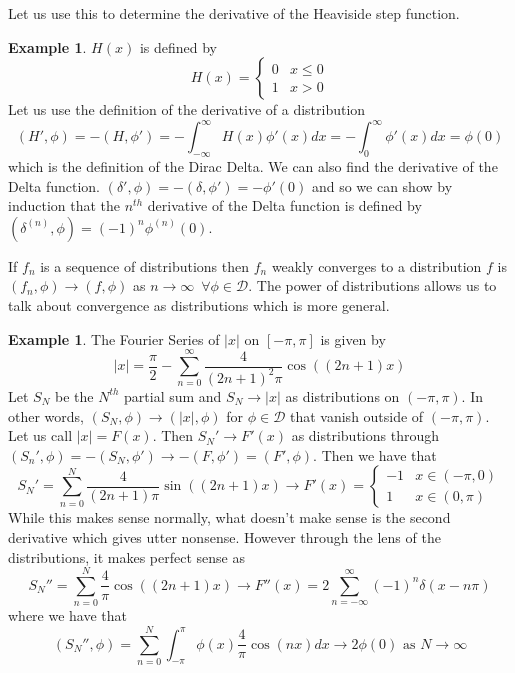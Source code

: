 \documentclass{article}
\theoremstyle{definition}
\newtheorem{example}[theorem]{Example}
\begin{document}
Let us use this to determine the derivative of the Heaviside step function.
\begin{example}
    $H(x)$ is defined by 
    \begin{equation*}
        H(x) = \begin{cases}
            0 & x \leq 0 \\ 1 & x>0
        \end{cases}
    \end{equation*}
    Let us use the definition of the derivative of a distribution 
    \begin{equation*}
        (H',\phi) = -(H,\phi') = -\int^\infty_{-\infty} H(x)\phi'(x)dx = -\int^\infty_0 \phi'(x)dx = \phi(0)
    \end{equation*}
    which is the definition of the Dirac Delta. We can also find the derivative of the Delta function. $(\delta ',\phi) = -(\delta, \phi') =-\phi'(0)$ and so we can show by induction that the $n^{th}$ derivative of the Delta function is defined by $(\delta^{(n)},\phi) = (-1)^n\phi^{(n)}(0)$.
\end{example}
If $f_n$ is a sequence of distributions then $f_n$ weakly converges to a distribution $f$ is $(f_n,\phi)\to (f,\phi)$ as $n\to \infty\,\,\,\forall \phi \in \mathcal{D}$.
The power of distributions allows us to talk about convergence as distributions which is more general. 
\begin{example}
    The Fourier Series of $|x|$ on $[-\pi,\pi]$ is given by 
    \begin{equation*}
        |x| = \frac{\pi}{2} -\sum^\infty_{n=0} \frac{4}{(2n+1)^2 \pi} \cos((2n+1)x)
    \end{equation*}
    Let $S_N$ be the $N^{th}$ partial sum and $S_N \to |x|$ as distributions on $(-\pi,\pi)$. In other words, $(S_N, \phi) \to (|x|,\phi)$ for $\phi \in \mathcal{D}$ that vanish outside of $(-\pi,\pi)$. Let us call $|x| = F(x)$. Then $S_N' \to F'(x)$ as distributions through $(S_n', \phi) = - (S_N,\phi') \to -(F,\phi')=(F',\phi)$. Then we have that 
    \begin{equation*}
        S_N' = \sum ^N_{n=0} \frac{4}{(2n+1)\pi} \sin((2n+1)x)  \to F'(x) = \begin{cases}
            -1 & x\in (-\pi,0) \\
            1 & x\in (0,\pi)
        \end{cases}
    \end{equation*}
    While this makes sense normally, what doesn't make sense is the second derivative which gives utter nonsense. However through the lens of the distributions, it makes perfect sense as 
    \begin{equation*}
        S_N'' = \sum^N_{n=0} \frac{4}{\pi}\cos((2n+1)x) \to F''(x) = 2 \sum^\infty_{n=-\infty} (-1)^n \delta (x-n\pi)
    \end{equation*}
    where we have that 
    \begin{equation*}
        (S_N'',\phi) = \sum^N_{n=0} \int^\pi_{-\pi} \phi(x) \frac{4}{\pi}\cos(nx)dx \to 2\phi(0) \text{ as } N \to \infty
    \end{equation*}
\end{example}
\end{document}
